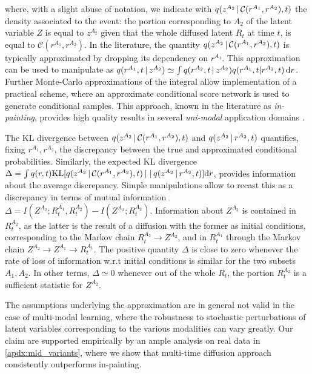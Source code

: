 where, with a slight abuse of notation, we indicate with $q(z^{A_2}\,|\, \mathcal{C}(r^{A_1},r^{A_2}),t)$ the density associated to the event: the portion corresponding to $A_2$ of the latent variable $Z$ is equal to $z^{A_2}$ given that the whole diffused latent $R_t$ at time $t$, is equal to $\mathcal{C}(r^{A_1},r^{A_2})$. In the literature, the quantity $q(z^{A_2}\,|\, \mathcal{C}(r^{A_1},r^{A_2}),t)$ is typically approximated by dropping its dependency on $r^{A_1}$. This approximation can be used to manipulate  as $q(r^{A_1},t\,|\, z^{A_2})\simeq \int q(r^{A_2},t\,|\, z^{A_2})q(r^{A_1},t|r^{A_2},t)\operatorname{d}\!{r}$. Further Monte-Carlo approximations \citep{Song2020,lugmayr2022repaint} of the integral allow implementation of a practical scheme, where an approximate conditional score network is used to generate conditional samples. This approach, known in the literature as \textit{in-painting}, provides high quality results in several \textit{uni-modal} application domains \citep{Song2020,lugmayr2022repaint}. 

The \gls{KL} divergence between $q(z^{A_2}\,|\, \mathcal{C}(r^{A_1},r^{A_2}),t)$ and $q(z^{A_2}\,|\, r^{A_2},t)$ quantifies, fixing $r^{A_1},r^{A_2}$, the discrepancy between the true and approximated conditional probabilities. Similarly, the expected \gls{KL} divergence $\Delta=\int q(r,t)\mathrm{KL}[q(z^{A_2}\,|\, \mathcal{C}(r^{A_1},r^{A_2}),t)\,|\,\,|\, q(z^{A_2}\,|\, r^{A_2},t)]\dd r$, provides information about the average discrepancy. Simple manipulations allow to recast this as a discrepancy in terms of mutual information $\Delta=I(Z^{A_2};R^{A_1}_t,R^{A_2}_t)-I(Z^{A_2};R^{A_2}_t)$. Information about $Z^{A_2}$ is contained in $R^{A_2}_t$, as the latter is the result of a diffusion with the former as initial conditions, corresponding to the Markov chain $R^{A_2}_t\rightarrow Z^{A_2}$, and in $R^{A_1}_t$ through the Markov chain $Z^{A_2} \rightarrow Z^{A_1} \rightarrow R^{A_1}_t$. The positive quantity $\Delta$ is close to zero whenever the rate of loss of information w.r.t initial conditions is similar for the two subsets $A_1,A_2$. In other terms, $\Delta\simeq 0$ whenever out of the whole $R_t$, the portion $R^{A_2}_t$ is a sufficient statistic for $Z^{A_2}$.  

The assumptions underlying the approximation are in general not valid in the case of multi-modal learning, where the robustness to stochastic perturbations of latent variables corresponding to the various modalities can vary greatly. Our claim are supported empirically by an ample analysis on real data in \ref{apdx:mld_variants}, where we show that multi-time diffusion approach consistently outperforms in-painting.

